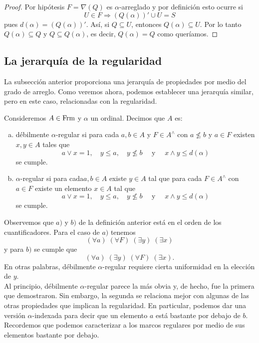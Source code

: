 \begin{proof}
    Por hipótesis $F=\nabla (Q)$ es $\alpha$-arreglado y por definición esto ocurre si 
    \[
    U\in F\Rightarrow (Q(\alpha))'\cup U=S
    \]
    pues $d(\alpha)=(Q(\alpha))'$. Así, si $Q\subseteq U$, entonces $Q(\alpha)\subseteq U$. Por lo tanto $Q(\alpha)\subseteq Q$ y $Q\subseteq Q(\alpha)$, es decir, $Q(\alpha)=Q$ como queríamos.
\end{proof}

\subsection{La jerarquía de la regularidad}

La subsección anterior proporciona una jerarquía de propiedades por medio del grado de arreglo. Como veremos ahora, podemos establecer una jerarquía similar, pero en este caso, relacionadas con la regularidad.

\begin{dfn}\label{Definición8.3.1}
    Consideremos $A\in \mathrm{Frm}$ y $\alpha$ un ordinal. Decimos que $A$ es:
    \begin{enumerate}[a)]
        \item débilmente $\alpha$-regular si para cada $a, b\in A$ y $F\in A^\wedge$ con $a\nleq b$ y $a\in F$ existen $x, y\in A$ tales que 
        \[
        a\vee x=1,\quad y\leq a,\quad y\nleq b\quad \mbox{ y }\quad x\wedge y\leq d(\alpha)
        \]
        se cumple.
        \item $\alpha$-regular si para cada$a,b\in A$ existe $y\in A$ tal que para cada $F\in A^\wedge$ con $a\in F$ existe un elemento $x\in A$ tal que 
        \[
        a\vee x=1,\quad y\leq a,\quad y\nleq b\quad \mbox{ y }\quad x\wedge y\leq d(\alpha)
        \]
        se cumple.
    \end{enumerate}
\end{dfn}

Observemos que $a)$ y $b)$ de la definición anterior está en el orden de los cuantificadores. Para el caso de $a)$ tenemos 
\[
(\forall a)\; (\forall F)\; (\exists y)\; (\exists x)
\]
y para $b)$ se cumple que 
\[
(\forall a)\; (\exists y)\; (\forall F)\; (\exists x).
\]
En otras palabras, débilmente $\alpha$-regular requiere cierta uniformidad en la elección de $y$.\\

Al principio, débilmente $\alpha$-regular parece la más obvia y, de hecho, fue la primera que demostraron. Sin embargo, la segunda se relaciona mejor con algunas de las otras propiedades que implican la regularidad. En particular, podemos dar una versión $\alpha$-indexada para decir que un elemento $a$ está bastante por debajo de $b$. Recordemos que podemos caracterizar a los marcos regulares por medio de sus elementos bastante por debajo.

